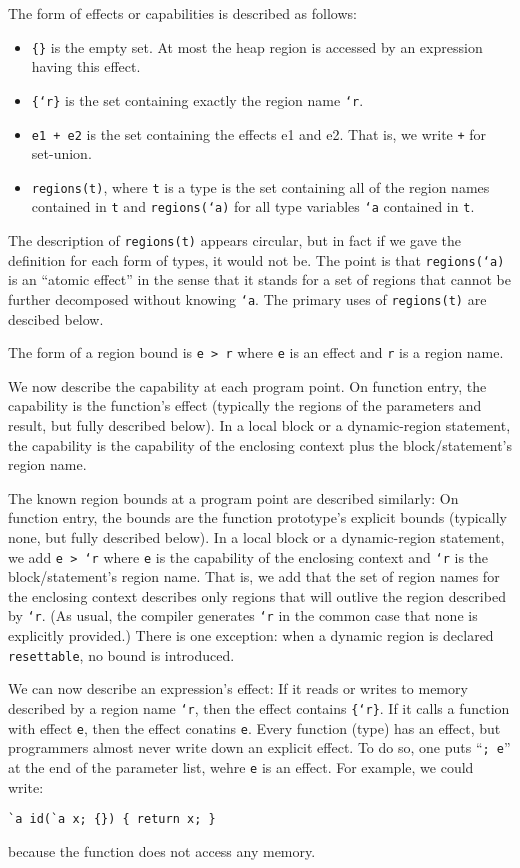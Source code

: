 The form of effects or capabilities is described as follows:
\begin{itemize}
\item \texttt{\{\}} is the empty set.  At most the heap region
  is accessed by an expression having this effect.
\item \texttt{\{`r\}} is the set containing exactly the region name
  \texttt{`r}.
\item \texttt{e1 + e2} is the set containing the effects e1 and e2.
  That is, we write \texttt{+} for set-union.
\item \texttt{regions(t)}, where \texttt{t} is a type is the set
  containing all of the region names contained in \texttt{t} and
  \texttt{regions(`a)} for all type variables \texttt{`a} contained in
  \texttt{t}.
\end{itemize}
The description of \texttt{regions(t)} appears circular, but in fact
if we gave the definition for each form of types, it would not be.
The point is that \texttt{regions(`a)} is an ``atomic effect'' in the
sense that it stands for a set of regions that cannot be further
decomposed without knowing \texttt{`a}.  The primary uses of
\texttt{regions(t)} are descibed below.

The form of a region bound is \texttt{e > r} where \texttt{e} is an
effect and \texttt{r} is a region name.

We now describe the capability at each program point.  On function
entry, the capability is the function's effect (typically the regions
of the parameters and result, but fully described below).  In
a local block or a dynamic-region statement, the capability is the
capability of the enclosing context plus the block/statement's region
name.

The known region bounds at a program point are described similarly:
On function entry, the bounds are the function prototype's explicit
bounds (typically none, but fully described below).  In a local block
or a dynamic-region statement, we add \texttt{e > `r} where \texttt{e}
is the capability of the enclosing context and \texttt{`r} is the
block/statement's region name.  That is, we add that the set of region names
for the enclosing context describes only regions that will outlive the
region described by \texttt{`r}.  (As usual, the compiler generates
\texttt{`r} in the common case that none is explicitly provided.)
There is one exception: when a dynamic region is declared
\texttt{resettable}, no bound is introduced.

We can now describe an expression's effect: If it reads or writes to
memory described by a region name \texttt{`r}, then the effect
contains \texttt{\{`r\}}.  If it calls a function with effect
\texttt{e}, then the effect conatins \texttt{e}.  Every function
(type) has an effect, but programmers almost never write down an
explicit effect.  To do so, one puts ``\texttt{; e}'' at the end of
the parameter list, wehre \texttt{e} is an effect.  For example, we
could write:
\begin{verbatim}
`a id(`a x; {}) { return x; }
\end{verbatim}
because the function does not access any memory.

